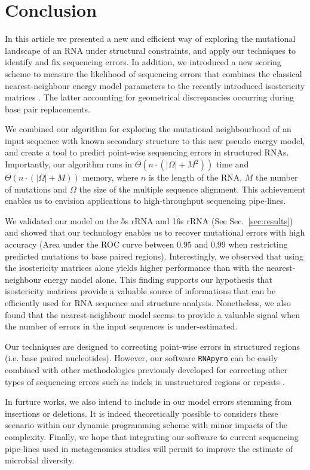 \section{Conclusion}
\label{sec:conclusion}

In this article we presented a new and efficient way of exploring the mutational landscape of an RNA under structural constraints,
and apply our techniques to identify and fix sequencing errors. In addition, we introduced a new scoring scheme to measure the
likelihood of sequencing errors that combines the classical nearest-neighbour energy model parameters \citep{Turner2010} to the
recently introduced isostericity matrices \citep{Stombaugh2009}. The latter accounting for geometrical discrepancies occurring
during base pair replacements.

We combined our algorithm for exploring the mutational neighbourhood of an input sequence with known secondary structure to
this new pseudo energy model, and create a tool to predict point-wise sequencing errors in structured RNAs. Importantly, our
algorithm runs in  $\Theta(n\cdot(|\Omega|+M^2))$ time and $\Theta(n\cdot(|\Omega|+M))$ memory, where $n$ is the length of
the RNA, $M$ the number of mutations and $\Omega$ the size of the multiple sequence alignment. This achievement enables
us to envision applications to high-throughput sequencing pipe-lines.

We validated our model on the 5s rRNA and 16s rRNA (See Sec.~\ref{sec:results}) and showed that our technology enables us
to recover mutational errors with high accuracy (Area under the ROC curve between $0.95$ and $0.99$ when restricting predicted mutations to base paired regions). Interestingly, we observed that using the isostericity matrices alone yields higher performance
than with the nearest-neighbour energy model alone. This finding supports our hypothesis that isostericity matrices provide a
valuable source of informations that can be efficiently used for RNA sequence and structure analysis. Nonetheless, we also found
that the nearest-neighbour model seems to provide a valuable signal when the number of errors in the input sequences is under-estimated.

Our techniques are designed to correcting point-wise errors in structured regions (i.e. base paired nucleotides). However,
our software \texttt{RNApyro} can be easily combined with other methodologies previously developed for correcting other types
of sequencing errors such as indels in unstructured regions or repeats \citep{Quinlan2008,Quince:2009uq}. 

In furture works, we
also intend to include in our model errors stemming from insertions or deletions. It is indeed theoretically possible to considers
these scenario within our dynamic programming scheme \citep{Waldispuhl:2002fk} with minor impacts of the complexity.
Finally, we hope that integrating our software to current sequencing pipe-lines used in metagenomics studies will permit to
improve the estimate of microbial diversity.


